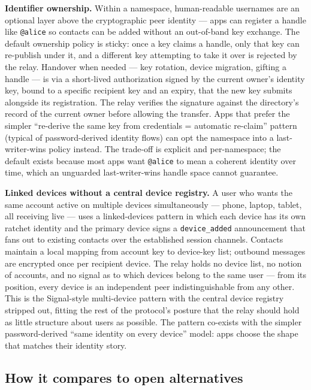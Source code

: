\documentclass[11pt, a4paper]{article}
\begin{document}
\textbf{Identifier ownership.} Within a namespace, human-readable usernames are an optional layer above the cryptographic peer identity --- apps can register a handle like \texttt{@alice} so contacts can be added without an out-of-band key exchange. The default ownership policy is sticky: once a key claims a handle, only that key can re-publish under it, and a different key attempting to take it over is rejected by the relay. Handover when needed --- key rotation, device migration, gifting a handle --- is via a short-lived authorization signed by the current owner's identity key, bound to a specific recipient key and an expiry, that the new key submits alongside its registration. The relay verifies the signature against the directory's record of the current owner before allowing the transfer. Apps that prefer the simpler ``re-derive the same key from credentials = automatic re-claim'' pattern (typical of password-derived identity flows) can opt the namespace into a last-writer-wins policy instead. The trade-off is explicit and per-namespace; the default exists because most apps want \texttt{@alice} to mean a coherent identity over time, which an unguarded last-writer-wins handle space cannot guarantee.

\textbf{Linked devices without a central device registry.} A user who wants the same account active on multiple devices simultaneously --- phone, laptop, tablet, all receiving live --- uses a linked-devices pattern in which each device has its own ratchet identity and the primary device signs a \texttt{device\_added} announcement that fans out to existing contacts over the established session channels. Contacts maintain a local mapping from account key to device-key list; outbound messages are encrypted once per recipient device. The relay holds no device list, no notion of accounts, and no signal as to which devices belong to the same user --- from its position, every device is an independent peer indistinguishable from any other. This is the Signal-style multi-device pattern with the central device registry stripped out, fitting the rest of the protocol's posture that the relay should hold as little structure about users as possible. The pattern co-exists with the simpler password-derived ``same identity on every device'' model: apps choose the shape that matches their identity story.

\subsection*{How it compares to open alternatives}
\end{document}
